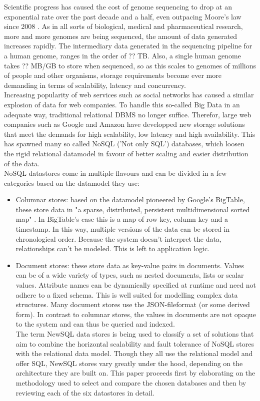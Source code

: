 \documentclass{IEEEtran}
\begin{document}
Scientific progress has caused the cost of genome sequencing to drop at an exponential rate over the past decade and a half, even outpacing Moore's law since 2008 \cite{wetterstrand_sequencing_cost}. As in all sorts of biological, medical and pharmaceutical research, more and more genomes are being sequenced, the amount of data generated increases rapidly. The intermediary data generated in the sequencing pipeline for a human genome, ranges in the order of ?? TB. Also, a single human genome takes ?? MB/GB to store when sequenced,%
 so as this scales to genomes of millions of people and other organisms, storage requirements become ever more demanding in terms of scalability, latency and concurrency.
\\Increasing popularity of web services such as social networks has caused a similar explosion of data for web companies. To handle this so-called Big Data\cite{mashey1997big} in an adequate way, traditional relational DBMS no longer suffice. Therefor, large web companies such as Google and Amazon have developped new storage solutions that meet the demands for high scalability, low latency and high availability\cite{baker2011megastore}. This has spawned many so called NoSQL ('Not only SQL') databases, which loosen the rigid relational datamodel in favour of better scaling and easier distribution of the data.
\\NoSQL datastores come in multiple flavours and can be divided in a few categories based on the datamodel they use:
\begin{itemize}
\item Columnar stores: based on the datamodel pioneered by Google's BigTable, these store data in "a sparse, distributed, persistent multidimensional sorted map" \cite{chang2008bigtable}. In BigTable's case this is a map of row key, column key and a timestamp. In this way, multiple versions of the data can be stored in chronological order. Because the system doesn't interpret the data, relationships can't be modeled. This is left to application logic\cite{hecht2011nosql}.
\item Document stores: these store data as key-value pairs in documents. Values can be of a wide variety of types, such as nested documents, lists or scalar values. Attribute names can be dynamically specified at runtime and need not adhere to a fixed schema\cite{cattell2011scalable}. This is well suited for modelling complex data structures. Many document stores use the JSON-fileformat (or some derived form). In contrast to columnar stores, the values in documents are not opaque to the system and can thus be queried and indexed\cite{hecht2011nosql}.\\
The term NewSQL data stores is being used to classify a set of solutions that aim to combine the horizontal scalability and fault tolerance of NoSQL stores with the relational data model. Though they all use the relational model and offer SQL, NewSQL stores vary greatly under the hood, depending on the architecture they are built on\cite{grolinger2013data}. This paper proceeds first by elaborating on the methodology used to select and compare the chosen databases and then by reviewing each of the six datastores in detail.
\end{itemize}
\end{document}
